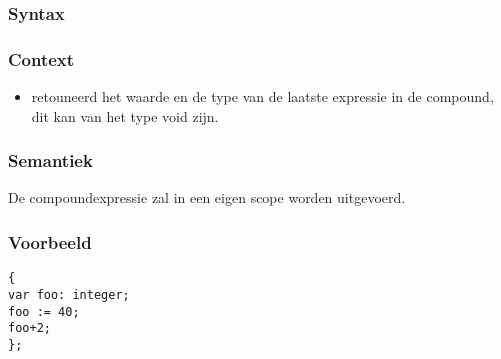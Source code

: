 \documentclass[]{article}
\begin{document}
\subsubsection{Syntax}

\subsubsection{Context}
\begin{itemize}
\item retouneerd het waarde en de type van de laatste expressie in de compound, dit kan van het type void zijn.
\end{itemize}
\subsubsection{Semantiek}
De compoundexpressie zal in een eigen scope worden uitgevoerd.
\subsubsection{Voorbeeld}
\begin{lstlisting}[style=SELMA]
{
var foo: integer;
foo := 40;
foo+2;
};
\end{lstlisting}



%
%



%
%
%
\end{document}
